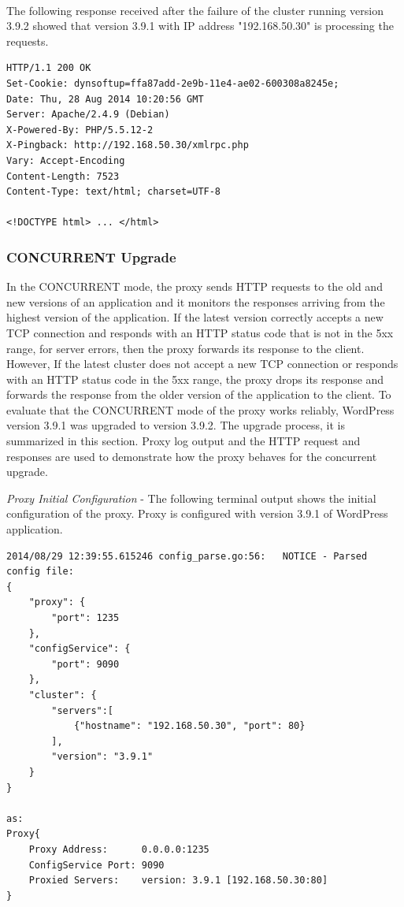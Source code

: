 \documentclass[a4paper,11pt,twoside]{report}
\begin{document}
\noindent\\
The following response received after the failure of the cluster running version 3.9.2 showed that version 3.9.1 with IP address "192.168.50.30" is processing the requests.\smallskip

\begin{lstlisting}[language=terminal]
HTTP/1.1 200 OK
Set-Cookie: dynsoftup=ffa87add-2e9b-11e4-ae02-600308a8245e;
Date: Thu, 28 Aug 2014 10:20:56 GMT
Server: Apache/2.4.9 (Debian)
X-Powered-By: PHP/5.5.12-2
X-Pingback: http://192.168.50.30/xmlrpc.php
Vary: Accept-Encoding
Content-Length: 7523
Content-Type: text/html; charset=UTF-8
 
<!DOCTYPE html> ... </html>
\end{lstlisting}     

\subsubsection*{CONCURRENT Upgrade}
In the CONCURRENT mode, the proxy sends HTTP requests to the old and new versions of an application and it monitors the responses arriving from the highest version of the application. If the latest version correctly accepts a new TCP connection and responds with an HTTP status code that is not in the 5xx range, for server errors, then the proxy forwards its response to the client. However, If the latest cluster does not accept a new TCP connection or responds with an HTTP status code in the 5xx range, the proxy drops its response and forwards the response from the older version of the application to the client. To evaluate that the CONCURRENT mode of the proxy works reliably, WordPress version 3.9.1 was upgraded to version 3.9.2. The upgrade process, it is summarized in this section. Proxy log output and the HTTP request and responses are used to demonstrate how the proxy behaves for the concurrent upgrade.

\noindent
\textit{Proxy Initial Configuration} - The following terminal output shows the initial configuration of the proxy. Proxy is configured with version 3.9.1 of WordPress application.\smallskip

\begin{lstlisting}[language=terminal]
2014/08/29 12:39:55.615246 config_parse.go:56:   NOTICE - Parsed config file:
{
    "proxy": {
        "port": 1235
    },
    "configService": {
        "port": 9090
    },
    "cluster": {
        "servers":[
            {"hostname": "192.168.50.30", "port": 80}
        ],
        "version": "3.9.1"
    }
}

as:
Proxy{
    Proxy Address:      0.0.0.0:1235
    ConfigService Port: 9090
    Proxied Servers:    version: 3.9.1 [192.168.50.30:80]
}
\end{lstlisting}  
\end{document}
